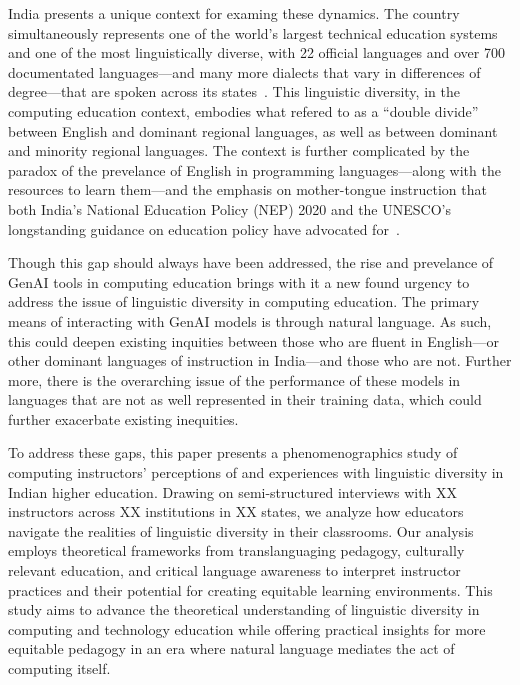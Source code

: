 India presents a unique context for examing these dynamics. The country
simultaneously represents one of the world's largest technical education
systems~\cite{goel2017echnical} and one of the most linguistically diverse, with
22 official languages and over 700 documentated languages---and many more
dialects that vary in differences of degree---that are spoken across its
states~\cite{2011census}. This linguistic diversity, in the computing education
context, embodies what \citet{mohanty2017language} refered to as a ``double
divide'' between English and dominant regional languages, as well as between
dominant and minority regional languages. The context is further complicated by
the paradox of the prevelance of English in programming languages---along with
the resources to learn them---and the emphasis on mother-tongue instruction that
both India's National Education Policy (NEP) 2020 and the UNESCO's longstanding 
guidance on education policy have advocated for~\cite{unesco1953vernacular, NEP2020}.

Though this gap should always have been addressed, the rise and prevelance of
GenAI tools in computing education brings with it a new found urgency to 
address the issue of linguistic diversity in computing education. The primary
means of interacting with GenAI models is through natural language. As such,
this could deepen existing inquities between those who are fluent in
English---or other dominant languages of instruction in India---and those who
are not. Further more, there is the overarching issue of the performance of
these models in languages that are not as well represented in their training
data, which could further exacerbate existing inequities.


To address these gaps, this paper presents a phenomenographics study of
computing instructors' perceptions of and experiences with linguistic diversity
in Indian higher education. Drawing on semi-structured interviews with XX
instructors across XX institutions in XX states, we analyze how educators
navigate the realities of linguistic diversity in their classrooms.
Our analysis employs theoretical frameworks from translanguaging pedagogy,
culturally relevant education, and critical language awareness to interpret
instructor practices and their potential for creating equitable learning
environments. This study aims to advance the theoretical understanding of
linguistic diversity in computing and technology education while offering
practical insights for more equitable pedagogy in an era where natural
language mediates the act of computing itself.
